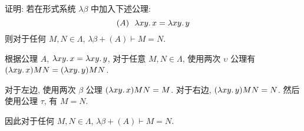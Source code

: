 \begin{problem}
证明: 若在形式系统 $\lambda\beta$ 中加入下述公理:
\[
(A) ~ ~ \lambda {xy}.\,{x} = \lambda {xy}.\,{y}
\]
则对于任何 $M, N \in \Lambda$, $\lambda\beta + (A) \vdash M = N$.
\end{problem}

\begin{solution}
根据公理 $A$, $\lambda {xy}.\,{x} = \lambda {xy}.\,{y}$, 对于任意 $M, N \in \Lambda$, 使用两次 $\upsilon$ 公理有 $(\lambda {xy}.\,{x}) M N = (\lambda {xy}.\,{y}) M N$.

对于左边, 使用两次 $\beta$ 公理 $(\lambda {xy}.\,{x}) M N = M$. 对于右边, $(\lambda {xy}.\,{y}) M N = N$. 然后使用公理 $\tau$, 有 $M = N$.

因此对于任何 $M, N \in \Lambda$, $\lambda\beta + (A) \vdash M = N$.
\end{solution}
